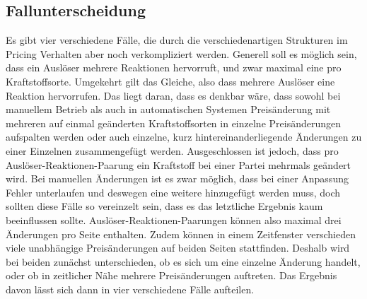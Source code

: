 \subsection{Fallunterscheidung}
Es gibt vier verschiedene Fälle, die durch die verschiedenartigen Strukturen im Pricing Verhalten aber noch verkompliziert werden. Generell soll es möglich sein, dass ein Auslöser mehrere Reaktionen hervorruft, und zwar maximal eine pro Kraftstoffsorte. Umgekehrt gilt das Gleiche, also dass mehrere Auslöser eine Reaktion hervorrufen. Das liegt daran, dass es denkbar wäre, dass sowohl bei manuellem Betrieb als auch in automatischen Systemen Preisänderung mit mehreren auf einmal geänderten Kraftstoffsorten in einzelne Preisänderungen aufspalten werden oder auch einzelne, kurz hintereinanderliegende Änderungen zu einer Einzelnen zusammengefügt werden. Ausgeschlossen ist jedoch, dass pro Auslöser-Reaktionen-Paarung ein Kraftstoff bei einer Partei mehrmals geändert wird. Bei manuellen Änderungen ist es zwar möglich, dass bei einer Anpassung Fehler unterlaufen und deswegen eine weitere hinzugefügt werden muss, doch sollten diese Fälle so vereinzelt sein, dass es das letztliche Ergebnis kaum beeinflussen sollte. Auslöser-Reaktionen-Paarungen können also maximal drei Änderungen pro Seite enthalten. Zudem können in einem Zeitfenster verschieden viele unabhängige Preisänderungen auf beiden Seiten stattfinden. Deshalb wird bei beiden zunächst unterschieden, ob es sich um eine einzelne Änderung handelt, oder ob in zeitlicher Nähe mehrere Preisänderungen auftreten. Das Ergebnis davon lässt sich dann in vier verschiedene Fälle aufteilen.

